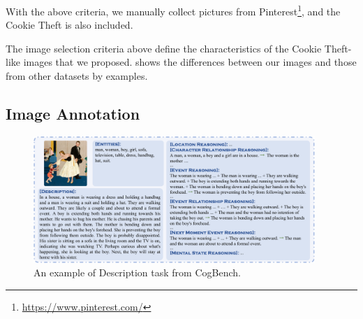 

With the above criteria, 
we manually collect pictures from Pinterest\footnote{\url{https://www.pinterest.com/}}, 
and the Cookie Theft is also included. %

The image selection criteria above define the characteristics of the Cookie Theft-like images that we proposed.
 shows the differences between our images and those from other datasets by examples.

\subsection{Image Annotation}
\label{sec:annotation}


\begin{figure}[h]
  \centering
  \includegraphics[width=0.95\textwidth]{figs/descrption_task_4.pdf}
  \caption{An example of Description task from CogBench. 
}
  \label{fig:cogbench}
\end{figure}


